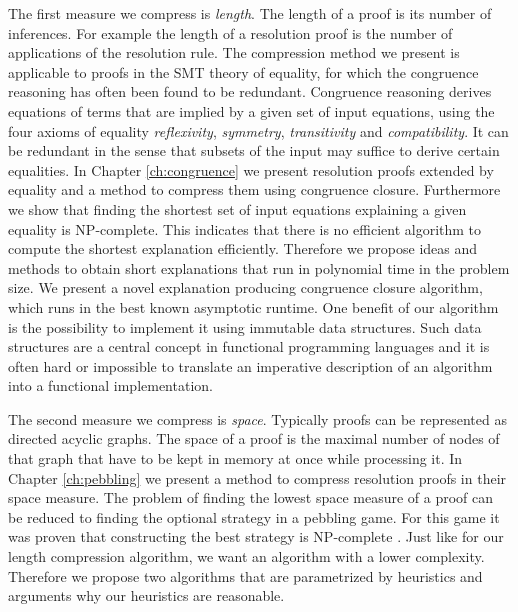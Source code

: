 The first measure we compress is \emph{length}.
The length of a proof is its number of inferences.
For example the length of a resolution proof is the number of applications of the resolution rule.
The compression method we present is applicable to proofs in the SMT theory of equality, for which the congruence reasoning has often been found to be redundant.
Congruence reasoning derives equations of terms that are implied by a given set of input equations, 
using the four axioms of equality \emph{reflexivity}, \emph{symmetry}, \emph{transitivity} and \emph{compatibility}. 
It can be redundant in the sense that subsets of the input may suffice to derive certain equalities.
In Chapter \ref{ch:congruence} we present resolution proofs extended by equality and a method to compress them using congruence closure.
Furthermore we show that finding the shortest set of input equations explaining a given equality is NP-complete.
This indicates that there is no efficient algorithm to compute the shortest explanation efficiently.
Therefore we propose ideas and methods to obtain short explanations that run in polynomial time in the problem size.
We present a novel explanation producing congruence closure algorithm, which runs in the best known asymptotic runtime.
One benefit of our algorithm is the possibility to implement it using immutable data structures.
Such data structures are a central concept in functional programming languages and it is often hard or impossible to translate an imperative description of an algorithm into a functional implementation.

The second measure we compress is \emph{space}.
Typically proofs can be represented as directed acyclic graphs.
The space of a proof is the maximal number of nodes of that graph that have to be kept in memory at once while processing it.
In Chapter \ref{ch:pebbling} we present a method to compress resolution proofs in their space measure.
The problem of finding the lowest space measure of a proof can be reduced to finding the optional strategy in a pebbling game.
For this game it was proven that constructing the best strategy is NP-complete \cite{Sethi1975}.
Just like for our length compression algorithm, we want an algorithm with a lower complexity.
Therefore we propose two algorithms that are parametrized by heuristics and arguments why our heuristics are reasonable.

